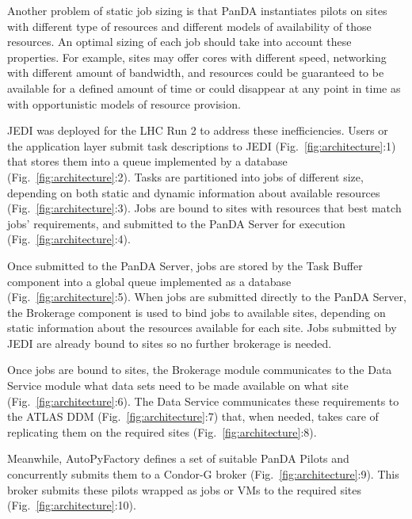 Another problem of static job sizing is that PanDA instantiates pilots on sites
with different type of resources and different models of availability of those
resources. An optimal sizing of each job should take into account these
properties. For example, sites may offer cores with different speed, networking
with different amount of bandwidth, and resources could be guaranteed to be
available for a defined amount of time or could disappear at any point in time
as with opportunistic models of resource provision.

JEDI was deployed for the LHC Run 2 to address these inefficiencies. Users or
the application layer submit task descriptions to JEDI
(Fig.~\ref{fig:architecture}:1) that stores them into a queue implemented by a
database (Fig.~\ref{fig:architecture}:2). Tasks are partitioned into jobs of
different size, depending on both static and dynamic information about available
resources (Fig.~\ref{fig:architecture}:3). Jobs are bound to sites with
resources that best match jobs' requirements, and submitted to the PanDA Server
for execution (Fig.~\ref{fig:architecture}:4).

Once submitted to the PanDA Server, jobs are stored by the Task Buffer component
into a global queue implemented as a  database (Fig.~\ref{fig:architecture}:5).
When jobs are submitted directly to the PanDA Server, the Brokerage component is
used to bind jobs to available sites, depending on static information about the
resources available for each site. Jobs submitted by JEDI are already bound to
sites so no further brokerage is needed.

Once jobs are bound to sites, the Brokerage module communicates to the Data
Service module what data sets need to be made available on what site
(Fig.~\ref{fig:architecture}:6). The Data Service communicates these
requirements to the ATLAS DDM (Fig.~\ref{fig:architecture}:7) that, when needed,
takes care of %
replicating them on the required sites (Fig.~\ref{fig:architecture}:8).

Meanwhile, AutoPyFactory defines a set of suitable PanDA Pilots and concurrently
submits them to a Condor-G broker (Fig.~\ref{fig:architecture}:9). This broker
submits these pilots wrapped as jobs or VMs to the required sites
(Fig.~\ref{fig:architecture}:10).


